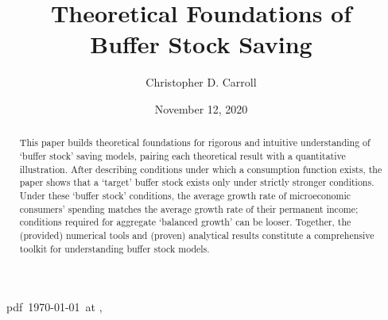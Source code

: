 \documentclass[BufferStockTheory]{subfiles}
\begin{document}
\providecommand{\versn}{pdf} %
\ifthenelse{\boolean{Web}}{    %
  \renewcommand{\versn}{Web}     %
  \renewcommand{\rootFromOut}{.} %
}{}  %

\hfill{\tiny \jobname~\versn~\today~{at} \DTMcurrenttime, ~~}

\title{Theoretical Foundations of \\ Buffer Stock Saving}

\author{Christopher D. Carroll\authNum}



\renewcommand{\forcedate}{November 12, 2020}
\date{\forcedate} %

\maketitle 
\hypertarget{abstract}{}
\begin{abstract}
  This paper builds theoretical foundations for rigorous and intuitive understanding of `buffer stock' saving models, pairing each theoretical result with a quantitative illustration.  After describing conditions under which a consumption function exists, the paper shows that a `target' buffer stock exists only under strictly stronger conditions.  Under these `buffer stock' conditions, the average growth rate of microeconomic consumers' spending matches the average growth rate of their permanent income; conditions required for aggregate `balanced growth' can be looser.  Together, the (provided) numerical tools and (proven) analytical results constitute a comprehensive toolkit for understanding buffer stock models.
\end{abstract}
\end{document}
